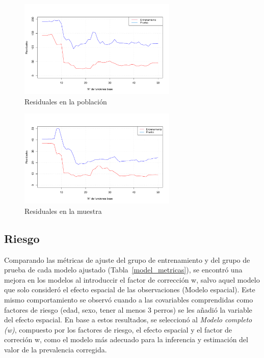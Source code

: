 

\newpage

\begin{figure}[h] 
	\centering
	\includegraphics[width=0.67\textwidth]{graficos/intensity_population_residuals.pdf}
	\caption{Residuales en la población} \label{intensity_population_residuals}
\end{figure}

\begin{figure}[h]
	\centering
	\includegraphics[width=0.67\textwidth]{graficos/intensity_sample_residuals.pdf}
	\caption{Residuales en la muestra} \label{intensity_sample_residuals}
\end{figure}

\newpage


\subsection{Riesgo}
Comparando las métricas de ajuste del grupo de entrenamiento y del grupo de prueba de cada modelo ajustado (Tabla~\ref{model_metricas}), se encontró una mejora en los modelos al introduccir el factor de corrección w, salvo aquel modelo que solo consideró el efecto espacial de las observaciones (Modelo espacial). Este mismo comportamiento se observó cuando a las covariables comprendidas como factores de riesgo (edad, sexo, tener al menos 3 perros) se les añadió la variable del efecto espacial. En base a estos resultados, se seleccionó al \textit{Modelo completo (w)}, compuesto por los factores de riesgo, el efecto espacial y el factor de correción w, como el modelo más adecuado para la inferencia y estimación del valor de la prevalencia corregida.

